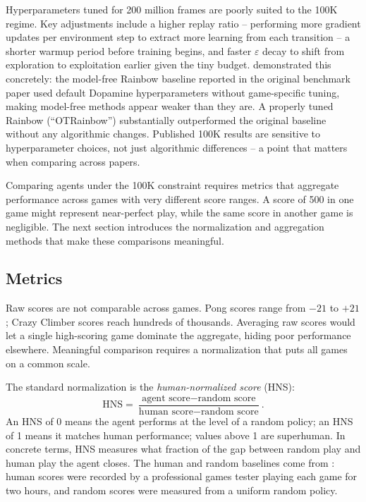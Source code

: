 \smallskip
Hyperparameters tuned for 200 million frames are poorly suited to
the 100K regime. Key adjustments include a higher replay ratio --
performing more gradient updates per environment step to extract
more learning from each transition -- a shorter warmup period
before training begins, and faster $\varepsilon$ decay to shift
from exploration to exploitation earlier given the tiny budget.
\citet{kielak2020recent} demonstrated this concretely: the
model-free Rainbow baseline reported in the original benchmark
paper used default Dopamine hyperparameters without
game-specific tuning, making model-free methods appear weaker than
they are. A properly tuned Rainbow (``OTRainbow'') substantially
outperformed the original baseline without any algorithmic changes.
Published 100K results are sensitive to hyperparameter choices, not
just algorithmic differences -- a point that matters when comparing
across papers.

\smallskip
Comparing agents under the 100K constraint requires metrics that
aggregate performance across games with very different score
ranges. A score of 500 in one game might represent near-perfect
play, while the same score in another game is negligible. The next
section introduces the normalization and aggregation methods that
make these comparisons meaningful.

\subsection{Metrics}
\label{subsec:metrics}

Raw scores are not comparable across games. Pong scores range from
$-21$ to $+21$; Crazy Climber scores reach hundreds of thousands.
Averaging raw scores would let a single high-scoring game dominate
the aggregate, hiding poor performance elsewhere. Meaningful
comparison requires a normalization that puts all games on a common
scale.

\smallskip
The standard normalization is the \emph{human-normalized score}
(HNS):
\begin{equation}
\label{eq:hns}
\text{HNS} = \frac{\text{agent score} - \text{random score}}
                   {\text{human score} - \text{random score}}.
\end{equation}
An HNS of 0 means the agent performs at the level of a random
policy; an HNS of 1 means it matches human performance; values
above 1 are superhuman. In concrete terms, HNS measures what
fraction of the gap between random play and human play the agent
closes. The human and random baselines come from
\citet{mnih2015human}: human scores were recorded by a
professional games tester playing each game for two hours, and
random scores were measured from a uniform random policy.

